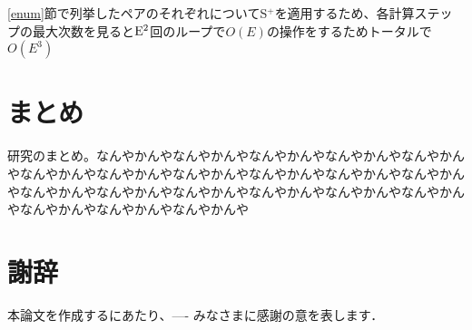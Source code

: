 \documentclass[11pt,a4j]{jarticle}
\newcommand{\splus}{S${}^\text{+}$}
\newcommand{\fl}[1]{$\rm{#1}$}
\begin{document}
\ref{enum}節で列挙したペアのそれぞれについて\splus を適用するため、各計算ステップの最大次数を見ると\fl{E^2}回のループで$O(E)$の操作をするためトータルで$O(E^3)$



\section{まとめ}
研究のまとめ。なんやかんやなんやかんやなんやかんやなんやかんやなんやかんやなんやかんやなんやかんやなんやかんやなんやかんやなんやかんやなんやかんやなんやかんやなんやかんやなんやかんやなんやかんやなんやかんやなんやかんやなんやかんやなんやかんやなんやかんや

\section*{謝辞} %
本論文を作成するにあたり、---- みなさまに感謝の意を表します．


\cite{keg}
\cite{ck3}
\end{document}
